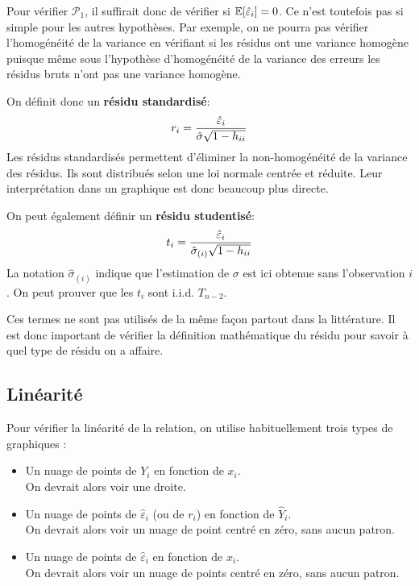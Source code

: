 Pour vérifier $\mathcal{P}_1$, il suffirait donc de vérifier si $\mathbb{E}[\hat\varepsilon_i]=0$. Ce n'est toutefois pas si simple pour les autres hypothèses. Par exemple, on ne pourra pas vérifier l'homogénéité de la variance en vérifiant si les résidus ont une variance homogène puisque même sous l'hypothèse d'homogénéité de la variance des erreurs les résidus bruts n'ont pas une variance homogène.

\newpage
On définit donc un \textbf{résidu standardisé}:
$$r_i = {\hat\varepsilon_i\over \hat\sigma \sqrt{1-h_{ii}}}$$
Les résidus standardisés permettent d'éliminer la non-homogénéité de la variance des résidus. Ils sont distribués selon une loi normale centrée et réduite. Leur interprétation dans un graphique est donc beaucoup plus directe.

On peut également définir un \textbf{résidu studentisé}:
$$t_i={\hat\varepsilon_i\over \hat{\sigma}_{(i)} \sqrt{1-h_{ii}}}$$
La notation $\hat{\sigma}_{(i)}$ indique que l'estimation de $\sigma$ est ici obtenue sans l'observation $i$. On peut prouver que les $t_i$ sont i.i.d. $T_{n-2}$.

\begin{remarque}
Ces termes ne sont pas utilisés de la même façon partout dans la littérature. Il est donc important de vérifier la définition mathématique du résidu pour savoir à quel type de résidu on a affaire.
\end{remarque}



\subsection{Linéarité}
\label{sec:Linéarité}
Pour vérifier la linéarité de la relation, on utilise habituellement trois types de graphiques :
\begin{itemize}
\item[$\bullet$] Un nuage de points de $Y_i$ en fonction de $x_i$.\\
On devrait alors voir une droite.
\item[$\bullet$] Un nuage de points de $\hat\varepsilon_i$ (ou de $r_i$) en fonction de $\hat{Y}_i$. \\
On devrait alors voir un nuage de point centré en zéro, sans aucun patron.
\item[$\bullet$] Un nuage de points de $\hat\varepsilon_i$ en fonction de $x_i$.\\
On devrait alors voir un nuage de points centré en zéro, sans aucun patron.
\end{itemize}

